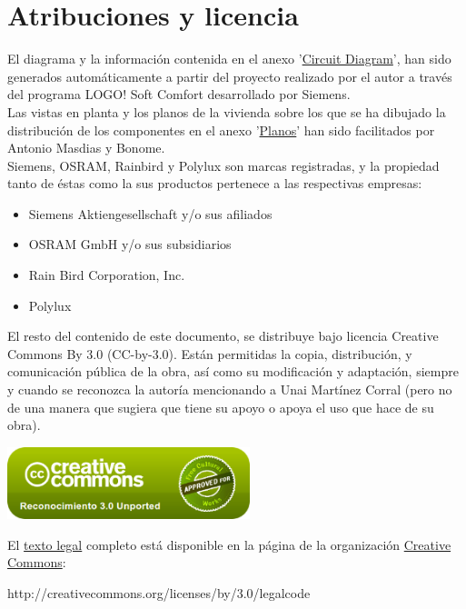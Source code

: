 \section{Atribuciones y licencia}

El diagrama y la informaci\'on contenida en el anexo '\hyperref[CircuitDiagram]{Circuit Diagram}', han sido generados autom\'aticamente a partir del proyecto realizado por el autor a trav\'es del programa LOGO! Soft Comfort desarrollado por Siemens. \\

Las vistas en planta y los planos de la vivienda sobre los que se ha dibujado la distribuci\'on de los componentes en el anexo '\hyperref[Planos]{Planos}' han sido facilitados por Antonio Masdias y Bonome. \\

Siemens, OSRAM, Rainbird y Polylux son marcas registradas, y la propiedad tanto de \'estas como la sus productos pertenece a las respectivas empresas:

\begin{itemize}
 \item Siemens Aktiengesellschaft y/o sus afiliados
 \item OSRAM GmbH y/o sus subsidiarios
 \item Rain Bird Corporation, Inc.
 \item Polylux
\end{itemize}

El resto del contenido de este documento, se distribuye bajo licencia Creative Commons By 3.0 (CC-by-3.0). Están permitidas la copia, distribución, y comunicación pública de la obra, así como su modificación y adaptación, siempre y cuando se reconozca la autoría mencionando a Unai Martínez Corral (pero no de una manera que sugiera que tiene su apoyo o apoya el uso que hace de su obra).

\begin{center}
 \includegraphics[width=200pt]{./ccby.png}
\end{center}

El \href{http://creativecommons.org/licenses/by/3.0/legalcode}{texto legal} completo está disponible en la página de la organización \href{http://creativecommons.org}{Creative Commons}:
\begin{center}http://creativecommons.org/licenses/by/3.0/legalcode\end{center}